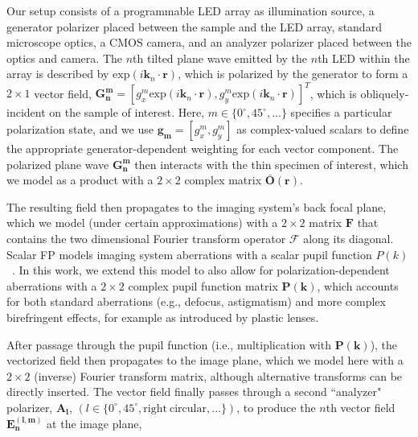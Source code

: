 \documentclass{article}
\providecommand{\vk}{\mathbf{k}}
\providecommand{\vrr}{\mathbf{r}}
\providecommand{\vk}{\mathbf{k}}
\begin{document}
Our setup consists of a programmable LED array as illumination source, a generator polarizer placed between the sample and the LED array, standard microscope optics, a CMOS camera, and an analyzer polarizer placed between the optics and camera. The $n$th tilted plane wave emitted by the $n$th LED within the array is described by $\text{exp}(i\vk_n \cdot \vrr)$, which is polarized by the generator to form a $2 \times 1$ vector field, $\mathbf{G_n^m }=\left[g_{x}^m\text{exp}(i\vk_n\cdot\vrr), g_{y}^m\text{exp}(i\vk_n\cdot\vrr)\right]^T$, which is obliquely-incident on the sample of interest. Here, $m\in\{0^{\circ},45^{\circ},...\}$ specifies a particular polarization state, and we use $\mathbf{g_m} = \left[g_{x}^m, g_{y}^m\right]$ as complex-valued scalars to define the appropriate generator-dependent weighting for each vector component. The polarized plane wave $\mathbf{G_n^m }$ then interacts with the thin specimen of interest, which we model as a product with a $2 \times 2$ complex matrix $\boldsymbol{\bar{O}}(\vrr)$. 

The resulting field then propagates to the imaging system's back focal plane, which we model (under certain approximations) with a $2 \times 2$ matrix $\mathbf{F}$ that contains the two dimensional Fourier transform operator $\mathcal{F}$ along its diagonal. Scalar FP models imaging system aberrations with a scalar pupil function $P(k)$~\cite{Ou:14}. In this work, we extend this model to also allow for polarization-dependent aberrations with a $2 \times 2$ complex pupil function matrix $\mathbf{P}(\mathbf{k})$, which accounts for both standard aberrations (e.g., defocus, astigmatism) and more complex birefringent effects, for example as introduced by plastic lenses. 

After passage through the pupil function (i.e., multiplication with $\mathbf{P}(\mathbf{k})$), the vectorized field then propagates to the image plane, which we model here with a $2 \times 2$ (inverse) Fourier transform matrix, although alternative transforms can be directly inserted. The vector field finally passes through a second ``analyzer" polarizer, $\mathbf{A_{l}}$, $(l\in\{0^{\circ},45^{\circ},\mathrm{right\ circular,}...\})$, to produce the  $n$th vector field $\mathbf{E_n^{(l,m)}}$ at the image plane,
\end{document}
